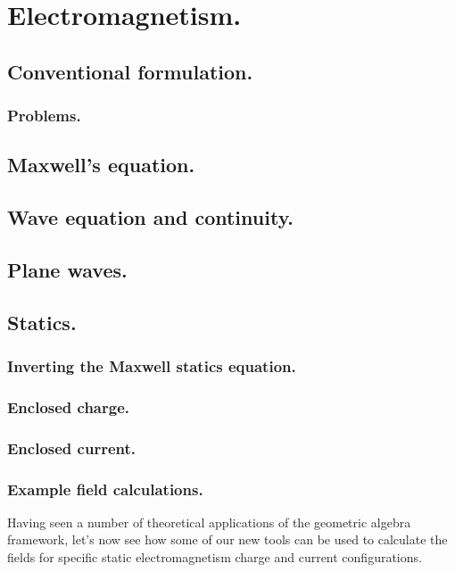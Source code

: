 %
%
   \chapter{Electromagnetism.}
      \section{Conventional formulation.}
         
         \subsection{Problems.}
            
      \section{Maxwell's equation.}
         
      \section{Wave equation and continuity.}
         
      \section{Plane waves.}
         
      \section{Statics.}
         \subsection{Inverting the Maxwell statics equation.}
            
         \subsection{Enclosed charge.}
            
         \subsection{Enclosed current.}
            
         \subsection{Example field calculations.}
            Having seen a number of theoretical applications of the geometric algebra framework, let's now see how some of our new tools can be used to calculate the fields for specific static electromagnetism charge and current configurations.
